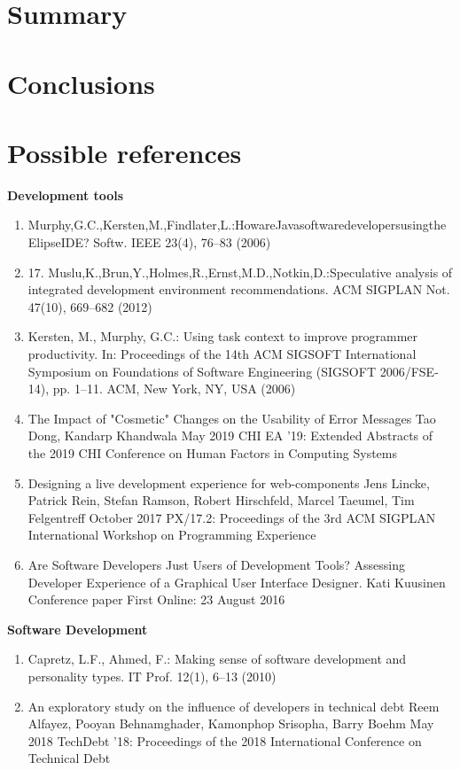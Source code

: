 \documentclass[english, 12pt, a4paper, sci, utf8, a-1b, online]{aaltothesis}
\begin{document}
\clearpage
\section{Summary}

\clearpage
\section{Conclusions}

\clearpage
\section{Possible references}

\textbf{Development tools}
\begin{enumerate}
  \item Murphy,G.C.,Kersten,M.,Findlater,L.:HowareJavasoftwaredevelopersusingtheElipseIDE? Softw. IEEE 23(4), 76–83 (2006)
  \item 17. Muslu,K.,Brun,Y.,Holmes,R.,Ernst,M.D.,Notkin,D.:Speculative analysis of integrated development environment recommendations. ACM SIGPLAN Not. 47(10), 669–682 (2012)
  \item Kersten, M., Murphy, G.C.: Using task context to improve programmer productivity. In: Proceedings of the 14th ACM SIGSOFT International Symposium on Foundations of Software Engineering (SIGSOFT 2006/FSE-14), pp. 1–11. ACM, New York, NY, USA (2006)
  \item The Impact of "Cosmetic" Changes on the Usability of Error Messages Tao Dong, Kandarp Khandwala May 2019 CHI EA '19: Extended Abstracts of the 2019 CHI Conference on Human Factors in Computing Systems
  \item Designing a live development experience for web-components Jens Lincke, Patrick Rein, Stefan Ramson, Robert Hirschfeld, Marcel Taeumel, Tim Felgentreff October 2017 PX/17.2: Proceedings of the 3rd ACM SIGPLAN International Workshop on Programming Experience
  \item Are Software Developers Just Users of Development Tools? Assessing Developer Experience of a Graphical User Interface Designer. Kati Kuusinen Conference paper First Online: 23 August 2016
\end{enumerate}

\textbf{Software Development}
\begin{enumerate}
  \item Capretz, L.F., Ahmed, F.: Making sense of software development and personality types. IT Prof. 12(1), 6–13 (2010)
  \item An exploratory study on the influence of developers in technical debt Reem Alfayez, Pooyan Behnamghader, Kamonphop Srisopha, Barry Boehm May 2018 TechDebt '18: Proceedings of the 2018 International Conference on Technical Debt
\end{enumerate}
\end{document}

